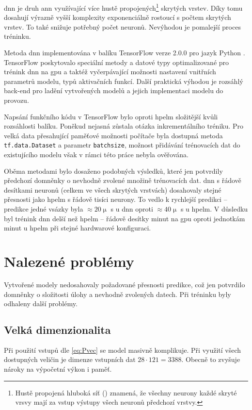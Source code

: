 \ac{dnn} je druh \ac{ann} využívající více hustě propojených\footnote{Hustě propojená hluboká síť () znamená, že všechny neurony každé 
skryté vrsvy mají za vstup výstupy všech neuronů předchozí vrstvy.} skrytých vrstev. Díky tomu dosahují výrazně vyšší komplexity exponenciálně 
rostoucí s počtem skrytých vrstev. To také snižuje potřebný počet neuronů. 
Nevýhodou je pomalejší proces 
tréninku. 

Metoda \ac{dnn} implementována v balíku TensorFlow verze 2.0.0 pro jazyk Python \cite{tensorflow}. TensorFlow poskytovalo speciální metody 
a datové typy optimalizované pro 
trénink \ac{dnn} na \ac{gpu} a taktéž vyčerpávající možnosti nastavení vnitřních parametrů modelu, typů aktivačních funkcí. Další praktická výhodou je 
rozsáhlý back-end pro ladění vytvořených modelů a jejich implementaci modelu do provozu. 

Napsání funkčního kódu v TensorFlow bylo oproti \ac{hpelm} složitější kvůli rozsáhlosti balíku. Poněkud nejasná zůstala otázka inkrementálního 
tréniku. Pro velká data přesahující paměťové možnosti počítače byla dostupná metoda \verb|tf.data.Dataset| a parametr \verb|batchsize|, možnost 
přidávání trénovacích dat do existujícího modelu však v rámci této práce nebyla ověřována.

Oběma metodami bylo dosaženo podobných výsledků, které jen potvrdily předchozí domněnky o nevhodně zvolené množině trénovacích dat. 
\ac{dnn} s řádově desítkami neuronů (celkem ve všech skrytých vrstvách) dosahovaly stejné přesnosti jako \acs{hpelm} s řádově tisíci 
neurony. To vedlo k rychlejší predikci -- predikce jedné vsázky byla $\approx 20 \upmu$ s u \ac{dnn} oproti $\approx 40 \upmu$ s u \ac{hpelm}.
V důsledku  byl trénink \ac{dnn} delší než \ac{hpelm} -- řádově desítky minut na \ac{gpu} oproti jednotkám minut u \ac{hpelm} 
při stejné hardwarové konfiguraci.
 
\section{Nalezené problémy}
Vytvořené modely nedosahovaly požadované přesnosti predikce, což jen potvrdilo domněnky o složitosti úlohy a nevhodně zvolených datech. 
Při tréninku byly odhaleny další problémy.

\subsection{Velká dimenzionalita}
Při použití vstupů dle \eqref{eq:Pvec} se model masivně komplikuje. Při využití všech dostupných veličin je dimenze vstupních dat $28\cdot 121 = 3388$. 
Obecně to zvyšuje nároky na výpočetní výkon i paměť.

